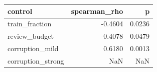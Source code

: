\begin{tabular}{lrr}
\toprule
          control &  spearman\_rho &      p \\
\midrule
   train\_fraction &       -0.4604 & 0.0236 \\
    review\_budget &       -0.4078 & 0.0479 \\
  corruption\_mild &        0.6180 & 0.0013 \\
corruption\_strong &           NaN &    NaN \\
\bottomrule
\end{tabular}
